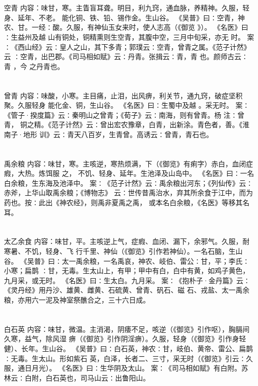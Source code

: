 \documentclass[12pt,UTF8]{ctexbook}
\begin{document}
\chapter{}空青
内容：味甘，寒。主眚盲耳聋。明目，利九窍，通血脉，养精神。久服，轻身、延年、不老。 
能化铜、铁、铅、锡作金。生山谷。 
《吴普》曰∶空青，神农、甘。一经∶酸。久服，有神仙玉女来时，使人志高（《御览 
》）。 
《名医》曰∶生益州及越 山有铜处，铜精熏则生空青，其腹中空，三月中旬采，亦无 
时。 
案∶《西山经》云∶皇人之山，其下多青；郭璞云∶空青，曾青之属。《范子计然》云 
∶空青，出巴郡。《司马相如赋》云∶丹青。张揖云∶青，青 也。颜师古云∶青 ，今 
之丹青也。 


\chapter{}曾青
内容：味酸，小寒。主目痛，止泪，出风痹，利关节，通九窍，破症坚积聚。久服轻身 
能化金、铜，生山谷。 
《名医》曰∶生蜀中及越 。采无时。 
案∶《管子·揆度篇》云∶秦明山之曾青；《荀子》云∶南海，则有曾青。杨 注∶曾青， 
铜之精。《范子计然》云∶曾出宏农豫章，白青，出新涂。青色者，善。《淮南子·地形 
训》云∶青天八百岁，生青曾。高诱云∶曾青，青石也。 


\chapter{}禹余粮
内容：味甘，寒。主咳逆，寒热烦满，下（《御览》有痢字）赤白，血闭症瘕，大热。炼饵服 
之， 
不饥、轻身、延年。生池泽及山岛中。 
《名医》曰∶一名白余粮，生东海及池泽中。 
案∶《范子计然》云∶禹余粮出河东；《列仙传》云∶赤斧，上华山取禹余粮；《博物志》 
云∶世传昔禹治水，弃其所余食于江中，而为药也。按∶此出《神农经》，则禹非夏禹之禹， 
或本名白余粮，《名医》等移其名耳。 


\chapter{}太乙余食
内容：味甘，平。主咳逆上气，症瘕、血闭、漏下，余邪气。久服，耐寒暑、不饥，轻身、飞 
行千里、神仙（《御览》引作若神仙）。一名石脑，生山谷。 
《吴普》曰∶太一禹余粮，一名禹哀，神农、岐伯、雷公∶甘，平；李氏∶小寒；扁鹊 
∶甘，无毒。生太山上，有甲；甲中有白，白中有黄，如鸡子黄色，九月采，或无时。 
《名医》曰∶生太白。九月采。 
案∶《抱朴子·金丹篇》云∶《灵丹经》用丹沙、雄黄、雌黄、石硫黄、曾青、矾石、磁 
石、戎盐、太一禹余粮，亦用六一泥及神室祭醮合之，三十六日成。 


\chapter{}白石英
内容：味甘，微温。主消渴，阴痿不足，咳逆（《御览》引作呕），胸膈间久寒，益气，除风湿 
痹（《御览》引作阴淫痹）。久服，轻身（《御览》引作身轻健）、长年。生山谷。 
《吴普》曰∶白石英，神农∶甘，岐伯、黄帝、雷公、扁鹊∶无毒。生太山。形如紫石 
英，白泽，长者二、三寸，采无时（《御览》引云∶久服，通日月光）。 
《名医》曰∶生华阴及太山。 
案∶《司马相如赋》有白附。苏林云∶白附，白石英也，司马山云∶出鲁阳山。 
\end{document}
